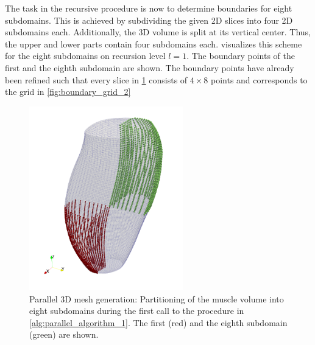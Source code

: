 The task in the recursive procedure is now to determine boundaries for eight subdomains. This is achieved by subdividing the given 2D slices into four 2D subdomains each. Additionally, the 3D volume is split at its vertical center. Thus, the upper and lower parts contain four subdomains each. 
 visualizes this scheme for the eight subdomains on recursion level $l=1$. The boundary points of the first and the eighth subdomain are shown. The boundary points have already been refined such that every slice in \cref{fig:subdomain} consists of $4 \times 8$ points and corresponds to the grid in \cref{fig:boundary_grid_2}
\begin{figure}%
  \centering%
  \includegraphics[height=8cm]{images/parallel_fiber_estimation/subdomains_2.png}%
  \caption{Parallel 3D mesh generation: Partitioning of the muscle volume into eight subdomains during the first call to the procedure in \cref{alg:parallel_algorithm_1}. The first (red) and the eighth subdomain (green) are shown.}%
  \label{fig:subdomain}%
\end{figure}%



